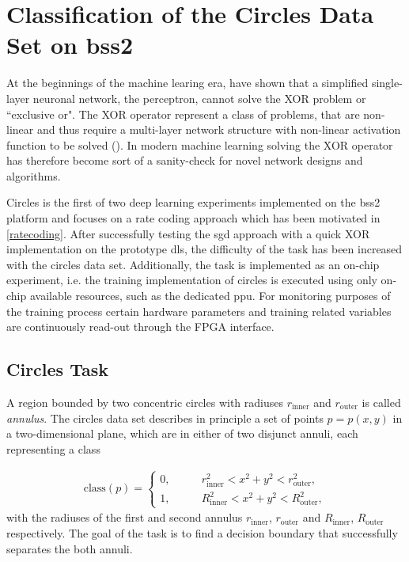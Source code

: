 \chapter{Classification of the Circles Data Set on \acrshort{bss2}}
\label{circles}
At the beginnings of the machine learing era, \cite{perceptron} have shown that a simplified single-layer neuronal network, the perceptron, cannot solve the XOR problem or ``exclusive or". The XOR operator represent a class of problems, that are non-linear and thus require a multi-layer network structure with non-linear activation function to be solved (\citealp{Goodfellow-et-al-2016}). In modern machine learning solving the XOR operator has therefore become sort of a sanity-check for novel network designs and algorithms.

Circles is the first of two deep learning experiments implemented on the \gls{bss2} platform and focuses on a rate coding approach which has been motivated in \cref{ratecoding}. After successfully testing the \acrlong{sgd} approach with a quick XOR implementation on the prototype \gls{dls}, the difficulty of the task has been increased with the circles data set. Additionally, the task is implemented as an on-chip experiment, i.e. the training implementation of circles is executed using only on-chip available resources, such as the dedicated \acrlong{ppu}. For monitoring purposes of the training process certain hardware parameters and training related variables are continuously read-out through the FPGA interface.





\section{Circles Task}
\label{circlestask}
A region bounded by two concentric circles with radiuses $r_{\text{inner}}$ and $r_{\text{outer}}$ is called \emph{annulus}. The circles data set describes in principle a set of points $p = p(x,y)$ in a two-dimensional plane, which are in either of two disjunct annuli, each representing a class 

\begin{align}
\text{class}(p) =
\begin{cases}
0 ,&\quad \quad r_{\text{inner}}^2 < x^2 + y^2 < r_{\text{outer}}^2, \\
1 ,&\quad \quad R_{\text{inner}}^2 < x^2 + y^2 < R_{\text{outer}}^2,
\end{cases}
\end{align}
with the radiuses of the first and second annulus $r_{\text{inner}}$, $r_{\text{outer}}$ and  $R_{\text{inner}}$, $R_{\text{outer}}$ respectively. The goal of the task is to find a decision boundary that successfully separates the both annuli.


